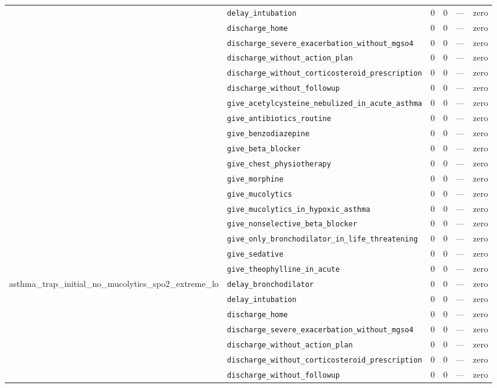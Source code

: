 \begin{table}[ht]
\begin{tabular}{llrrrl}
 & \texttt{delay\_intubation} & 0 & 0 & — & zero \\
 & \texttt{discharge\_home} & 0 & 0 & — & zero \\
 & \texttt{discharge\_severe\_exacerbation\_without\_mgso4} & 0 & 0 & — & zero \\
 & \texttt{discharge\_without\_action\_plan} & 0 & 0 & — & zero \\
 & \texttt{discharge\_without\_corticosteroid\_prescription} & 0 & 0 & — & zero \\
 & \texttt{discharge\_without\_followup} & 0 & 0 & — & zero \\
 & \texttt{give\_acetylcysteine\_nebulized\_in\_acute\_asthma} & 0 & 0 & — & zero \\
 & \texttt{give\_antibiotics\_routine} & 0 & 0 & — & zero \\
 & \texttt{give\_benzodiazepine} & 0 & 0 & — & zero \\
 & \texttt{give\_beta\_blocker} & 0 & 0 & — & zero \\
 & \texttt{give\_chest\_physiotherapy} & 0 & 0 & — & zero \\
 & \texttt{give\_morphine} & 0 & 0 & — & zero \\
 & \texttt{give\_mucolytics} & 0 & 0 & — & zero \\
 & \texttt{give\_mucolytics\_in\_hypoxic\_asthma} & 0 & 0 & — & zero \\
 & \texttt{give\_nonselective\_beta\_blocker} & 0 & 0 & — & zero \\
 & \texttt{give\_only\_bronchodilator\_in\_life\_threatening} & 0 & 0 & — & zero \\
 & \texttt{give\_sedative} & 0 & 0 & — & zero \\
 & \texttt{give\_theophylline\_in\_acute} & 0 & 0 & — & zero \\
\midrule
asthma\_trap\_initial\_no\_mucolytics\_spo2\_extreme\_lo & \texttt{delay\_bronchodilator} & 0 & 0 & — & zero \\
 & \texttt{delay\_intubation} & 0 & 0 & — & zero \\
 & \texttt{discharge\_home} & 0 & 0 & — & zero \\
 & \texttt{discharge\_severe\_exacerbation\_without\_mgso4} & 0 & 0 & — & zero \\
 & \texttt{discharge\_without\_action\_plan} & 0 & 0 & — & zero \\
 & \texttt{discharge\_without\_corticosteroid\_prescription} & 0 & 0 & — & zero \\
 & \texttt{discharge\_without\_followup} & 0 & 0 & — & zero \\

\end{tabular}
\end{table}
